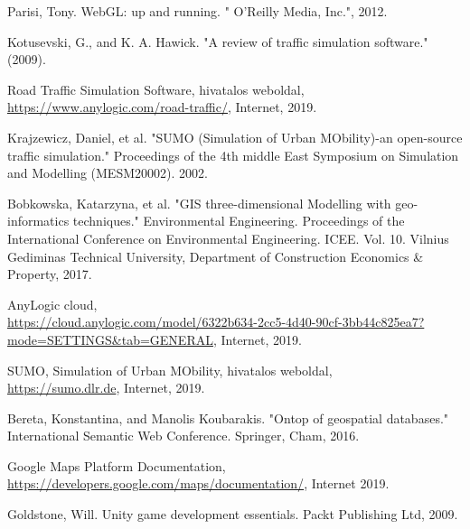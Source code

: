 
\begin{thebibliography}{x}

Parisi, Tony. WebGL: up and running. " O'Reilly Media, Inc.", 2012.

Kotusevski, G., and K. A. Hawick. "A review of traffic simulation software." (2009).

Road Traffic Simulation Software, hivatalos weboldal, \\
\url{https://www.anylogic.com/road-traffic/}, Internet, 2019.

Krajzewicz, Daniel, et al. "SUMO (Simulation of Urban MObility)-an open-source traffic simulation." Proceedings of the 4th middle East Symposium on Simulation and Modelling (MESM20002). 2002.

Bobkowska, Katarzyna, et al. "GIS three-dimensional Modelling with geo-informatics techniques." Environmental Engineering. Proceedings of the International Conference on Environmental Engineering. ICEE. Vol. 10. Vilnius Gediminas Technical University, Department of Construction Economics \& Property, 2017.

AnyLogic cloud, \\
\url{https://cloud.anylogic.com/model/6322b634-2cc5-4d40-90cf-3bb44c825ea7?mode=SETTINGS&tab=GENERAL},
Internet, 2019.

SUMO, Simulation of Urban MObility, hivatalos weboldal, \\
\url{https://sumo.dlr.de}, Internet, 2019.

Bereta, Konstantina, and Manolis Koubarakis. "Ontop of geospatial databases." International Semantic Web Conference. Springer, Cham, 2016.

Google Maps Platform Documentation,
\url{https://developers.google.com/maps/documentation/}, Internet 2019.

Goldstone, Will. Unity game development essentials. Packt Publishing Ltd, 2009.

\end{thebibliography}

